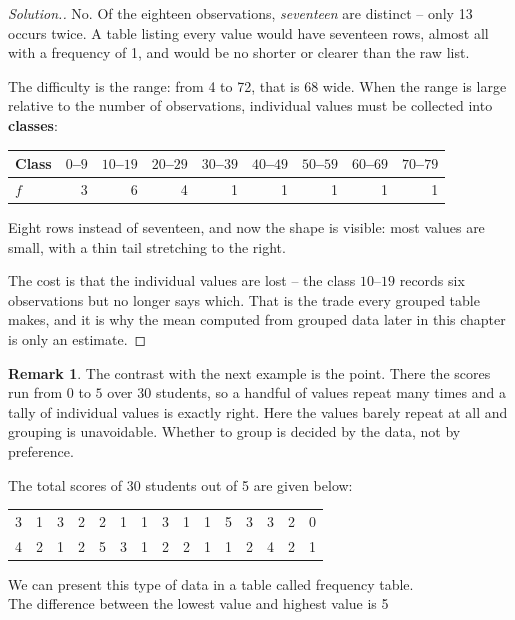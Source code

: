 \documentclass[11pt,a4paper]{article}
\theoremstyle{definition}
\newtheorem{remark}[thm]{Remark}
\newenvironment{solution}
  {\renewcommand{\qedsymbol}{}\begin{proof}[\textit{Solution}.]}
  {\end{proof}}
\begin{document}
\begin{solution}
No. Of the eighteen observations, \emph{seventeen} are distinct -- only 13 occurs twice. A
table listing every value would have seventeen rows, almost all with a frequency of 1, and
would be no shorter or clearer than the raw list.

The difficulty is the range: from 4 to 72, that is 68 wide. When the range is large relative
to the number of observations, individual values must be collected into \textbf{classes}:
\begin{table}[H]
\centering
\begin{tabular}{lrrrrrrrr}
Class & $0$--$9$ & $10$--$19$ & $20$--$29$ & $30$--$39$ & $40$--$49$ & $50$--$59$ & $60$--$69$ & $70$--$79$\\
\hline
$f$   & 3 & 6 & 4 & 1 & 1 & 1 & 1 & 1\\
\end{tabular}
\end{table}
Eight rows instead of seventeen, and now the shape is visible: most values are small, with
a thin tail stretching to the right.

The cost is that the individual values are lost -- the class $10$--$19$ records six
observations but no longer says which. That is the trade every grouped table makes, and it
is why the mean computed from grouped data later in this chapter is only an estimate.
\end{solution}

\begin{remark}
The contrast with the next example is the point. There the scores run from $0$ to $5$ over
30 students, so a handful of values repeat many times and a tally of individual values is
exactly right. Here the values barely repeat at all and grouping is unavoidable. Whether to
group is decided by the data, not by preference.
\end{remark}

The total scores of 30 students out of 5 are given below:
\begin{table}[h!]
\centering
\begin{tabular}{ccccccccccccccc}
3&1&3&2&2&1&1&3&1&1&5&3&3&2&0\\4&2&1&2&5&3&1&2&2&1&1&2&4&2&1\\
\end{tabular}
\end{table}

We can present this type of data in a table called frequency table.\\[1ex] The difference between the lowest value and highest value is 5
\end{document}
